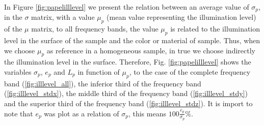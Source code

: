 \documentclass[review]{elsarticle}
\begin{document}
In Figure \ref{fig:papelilllevel} we present the relation between an average value of $\sigma_p$,
in the $\sigma$ matrix, with a value $\mu_p$ (mean value representing the illumination level) of the $\mu$ matrix, to all frequency bands, the value $\mu_p$
is related to the illumination level in the surface of the sample \cite{Nothdurft:05}
and the color or material of sample. Thus, when we choose $\mu_p$  as reference 
in a homogeneous sample,  
in true we choose indirectly the illumination level in the surface.
Therefore, Fig. \ref{fig:papelilllevel} shows the variables $\sigma_p$, $e_p$ and $L_p$ in function
of  $\mu_p$, to the case of the complete frequency band (\ref{fig:illlevel_all}), the inferior third of the frequency band (\ref{fig:illlevel_stdx}),
the middle third of the frequency band (\ref{fig:illlevel_stdy}) and the superior third of the frequency band (\ref{fig:illlevel_stdz}). It is import to note that $e_p$ was plot as a relation of $\sigma_p$, this means  $100 \frac{e_p}{\sigma_p} \%$.
\end{document}
